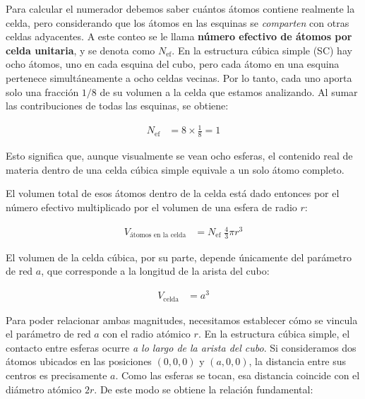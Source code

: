 \documentclass{article}
\begin{document}
Para calcular el numerador debemos saber cuántos átomos contiene realmente la celda, pero considerando que los átomos en las esquinas se \emph{comparten} con otras celdas adyacentes.  
A este conteo se le llama \textbf{número efectivo de átomos por celda unitaria}, y se denota como \(N_{\text{ef}}\).  
En la estructura cúbica simple (SC) hay ocho átomos, uno en cada esquina del cubo, pero cada átomo en una esquina pertenece simultáneamente a ocho celdas vecinas.  
Por lo tanto, cada uno aporta solo una fracción \(1/8\) de su volumen a la celda que estamos analizando.  
Al sumar las contribuciones de todas las esquinas, se obtiene:

\begin{equation}
\begin{split}
N_{\text{ef}} &= 8\times \frac{1}{8} = 1
\end{split} \label{eq:nef-sc}
\end{equation}

Esto significa que, aunque visualmente se vean ocho esferas, el contenido real de materia dentro de una celda cúbica simple equivale a un solo átomo completo.

El volumen total de esos átomos dentro de la celda está dado entonces por el número efectivo multiplicado por el volumen de una esfera de radio \(r\):

\begin{equation}
\begin{split}
V_{\text{átomos en la celda}} &= N_{\text{ef}}\;\frac{4}{3}\pi r^{3}
\end{split} \label{eq:vol-atomos}
\end{equation}

El volumen de la celda cúbica, por su parte, depende únicamente del parámetro de red \(a\), que corresponde a la longitud de la arista del cubo:

\begin{equation}
\begin{split}
V_{\text{celda}} &= a^{3}
\end{split} \label{eq:vol-celda}
\end{equation}

Para poder relacionar ambas magnitudes, necesitamos establecer cómo se vincula el parámetro de red \(a\) con el radio atómico \(r\).  
En la estructura cúbica simple, el contacto entre esferas ocurre \emph{a lo largo de la arista del cubo}.  
Si consideramos dos átomos ubicados en las posiciones \((0,0,0)\) y \((a,0,0)\), la distancia entre sus centros es precisamente \(a\).  
Como las esferas se tocan, esa distancia coincide con el diámetro atómico \(2r\).  
De este modo se obtiene la relación fundamental:
\end{document}
